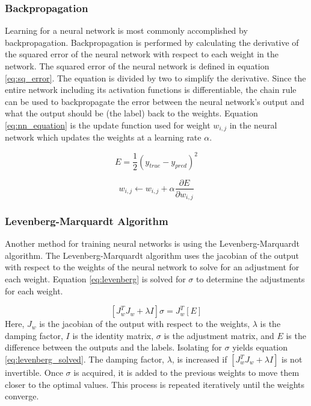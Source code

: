 \documentclass[letterpaper,12pt]{article}
\newcommand{\di}{\partial}
\begin{document}
\subsubsection{Backpropagation}
Learning for a neural network is most commonly accomplished by backpropagation. Backpropagation is performed by calculating the derivative of the squared error of the neural network with respect to each weight in the network. The squared error of the neural network is defined in equation \ref{eq:sq_error}. The equation is divided by two to simplify the derivative. Since the entire network including its activation functions is differentiable, the chain rule can be used to backpropagate the error between the neural network's output and what the output should be (the label) back to the weights. Equation \ref{eq:nn_equation} is the update function used for weight $w_{i,j}$ in the neural network which updates the weights at a learning rate $\alpha$.

\begin{equation}
	\label{eq:sq_error}
	E = \frac{1}{2}(y_{true} - y_{pred})^2
\end{equation}

\begin{equation}
	\label{eq:nn_equation}
	w_{i, j} \leftarrow w_{i,j} + \alpha \frac{\di E}{\di w_{i, j}}
\end{equation}

\subsubsection{Levenberg-Marquardt Algorithm}\label{sec:levenberg}
Another method for training neural networks is using the Levenberg-Marquardt algorithm. The Levenberg-Marquardt algorithm uses the jacobian of the output with respect to the weights of the neural network to solve for an adjustment for each weight. Equation \ref{eq:levenberg} is solved for $\sigma$ to determine the adjustments for each weight.

\begin{equation}
	\label{eq:levenberg}
	[J_w^T J_w + \lambda I]\sigma = J_w^T [E]
\end{equation}
Here, $J_w$ is the jacobian of the output with respect to the weights, $\lambda$ is the damping factor, $I$ is the identity matrix, $\sigma$ is the adjustment matrix, and $E$ is the difference between the outputs and the labels. Isolating for $\sigma$ yields equation \ref{eq:levenberg_solved}. The damping factor, $\lambda$, is increased if $[J_w^T J_w + \lambda I]$ is not invertible. Once $\sigma$ is acquired, it is added to the previous weights to move them closer to the optimal values. This process is repeated iteratively until the weights converge.
\end{document}
